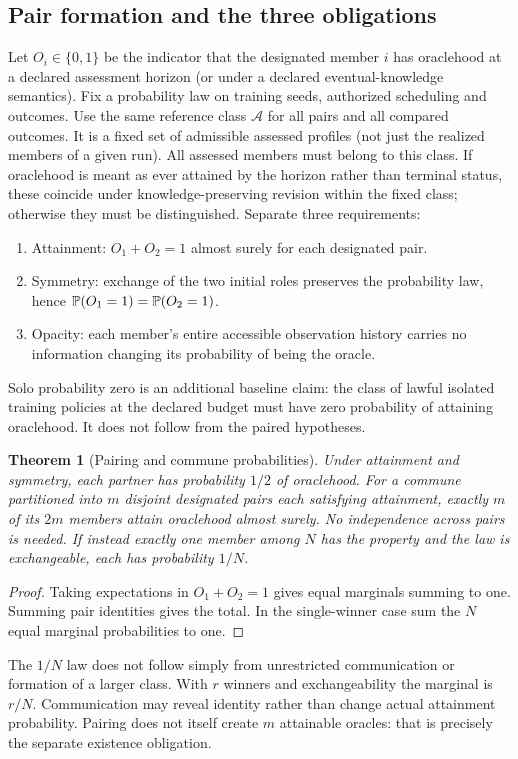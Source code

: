\documentclass[11pt]{article}
\newtheorem{theorem}{Theorem}[section]\newtheorem{proposition}[theorem]{Proposition}\newtheorem{lemma}[theorem]{Lemma}\newtheorem{corollary}[theorem]{Corollary}
\theoremstyle{definition}\newtheorem{definition}[theorem]{Definition}\newtheorem{conjecture}[theorem]{Conjecture}\newtheorem{example}[theorem]{Example}
\begin{document}
\subsection{Pair formation and the three obligations}
Let $O_i\in\{0,1\}$ be the indicator that the designated member $i$ has oraclehood at a declared assessment horizon (or under a declared eventual-knowledge semantics). Fix a probability law on training seeds, authorized scheduling and outcomes. Use the same reference class $\mathcal A$ for all pairs and all compared outcomes. It is a fixed set of admissible assessed profiles (not just the realized members of a given run). All assessed members must belong to this class. If oraclehood is meant as ever attained by the horizon rather than terminal status, these coincide under knowledge-preserving revision within the fixed class; otherwise they must be distinguished. Separate three requirements:
\begin{enumerate}
\item Attainment: $O_1+O_2=1$ almost surely for each designated pair.
\item Symmetry: exchange of the two initial roles preserves the probability law, hence $\mathbb P(O_1=1)=\mathbb P(O_2=1)$.
\item Opacity: each member's entire accessible observation history carries no information changing its probability of being the oracle.
\end{enumerate}
Solo probability zero is an additional baseline claim: the class of lawful isolated training policies at the declared budget must have zero probability of attaining oraclehood. It does not follow from the paired hypotheses.
\begin{theorem}[Pairing and commune probabilities]
Under attainment and symmetry, each partner has probability $1/2$ of oraclehood. For a commune partitioned into $m$ disjoint designated pairs each satisfying attainment, exactly $m$ of its $2m$ members attain oraclehood almost surely. No independence across pairs is needed. If instead exactly one member among $N$ has the property and the law is exchangeable, each has probability $1/N$.
\end{theorem}
\begin{proof}Taking expectations in $O_1+O_2=1$ gives equal marginals summing to one. Summing pair identities gives the total. In the single-winner case sum the $N$ equal marginal probabilities to one.\end{proof}
The $1/N$ law does not follow simply from unrestricted communication or formation of a larger class. With $r$ winners and exchangeability the marginal is $r/N$. Communication may reveal identity rather than change actual attainment probability. Pairing does not itself create $m$ attainable oracles: that is precisely the separate existence obligation.
\end{document}
